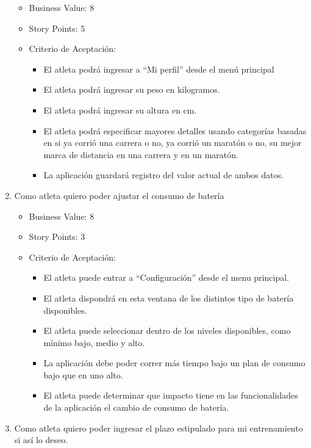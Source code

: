 \begin{enumerate}
  \begin{itemize}
  \itemsep1pt\parskip0pt
  \item
    Business Value: 8
  \item
    Story Points: 5
  \item
    Criterio de Aceptación:

    \begin{itemize}
    \itemsep1pt\parskip0pt
    \item
      El atleta podrá ingresar a ``Mi perfil'' desde el menú principal
    \item
      El atleta podrá ingresar su peso en kilogramos.
    \item
      El atleta podrá ingresar su altura en cm.
    \item
      El atleta podrá especificar mayores detalles usando categorías
      basadas en si ya corrió una carrera o no, ya corrió un maratón o
      no, su mejor marca de distancia en una carrera y en un maratón.
    \item
      La aplicación guardará registro del valor actual de ambos datos.
    \end{itemize}
  \end{itemize}
\item
  Como atleta quiero poder ajustar el consumo de batería

  \begin{itemize}
  \itemsep1pt\parskip0pt
  \item
    Business Value: 8
  \item
    Story Points: 3
  \item
    Criterio de Aceptación:

    \begin{itemize}
    \itemsep1pt\parskip0pt
    \item
      El atleta puede entrar a ``Configuración'' desde el menu
      principal.
    \item
      El atleta dispondrá en esta ventana de los distintos tipo de
      batería disponibles.
    \item
      El atleta puede seleccionar dentro de los niveles disponibles,
      como mínimo bajo, medio y alto.
    \item
      La aplicación debe poder correr más tiempo bajo un plan de consumo
      bajo que en uno alto.
    \item
      El atleta puede determinar que impacto tiene en las
      funcionalidades de la aplicación el cambio de consumo de batería.
    \end{itemize}
  \end{itemize}
\item
  Como atleta quiero poder ingresar el plazo estipulado para mi
  entrenamiento si así lo deseo.


\end{enumerate}
